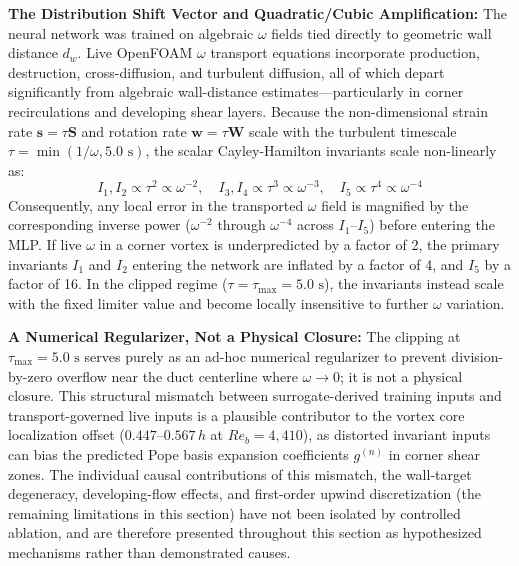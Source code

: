 \documentclass[11pt,a4paper]{article}
\begin{document}
\textbf{The Distribution Shift Vector and Quadratic/Cubic Amplification:} The neural network was trained on algebraic $\omega$ fields tied directly to geometric wall distance $d_w$. Live OpenFOAM $\omega$ transport equations incorporate production, destruction, cross-diffusion, and turbulent diffusion, all of which depart significantly from algebraic wall-distance estimates---particularly in corner recirculations and developing shear layers. Because the non-dimensional strain rate $\mathbf{s} = \tau \mathbf{S}$ and rotation rate $\mathbf{w} = \tau \mathbf{W}$ scale with the turbulent timescale $\tau = \min(1/\omega, 5.0\text{ s})$, the scalar Cayley-Hamilton invariants scale non-linearly as:
\begin{equation}
I_1, I_2 \propto \tau^2 \propto \omega^{-2}, \quad I_3, I_4 \propto \tau^3 \propto \omega^{-3}, \quad I_5 \propto \tau^4 \propto \omega^{-4}
\end{equation}
Consequently, any local error in the transported $\omega$ field is magnified by the corresponding inverse power ($\omega^{-2}$ through $\omega^{-4}$ across $I_1$--$I_5$) before entering the MLP. If live $\omega$ in a corner vortex is underpredicted by a factor of 2, the primary invariants $I_1$ and $I_2$ entering the network are inflated by a factor of 4, and $I_5$ by a factor of 16. In the clipped regime ($\tau = \tau_{\max} = 5.0\text{ s}$), the invariants instead scale with the fixed limiter value and become locally insensitive to further $\omega$ variation.

\textbf{A Numerical Regularizer, Not a Physical Closure:} The clipping at $\tau_{\max} = 5.0\text{ s}$ serves purely as an ad-hoc numerical regularizer to prevent division-by-zero overflow near the duct centerline where $\omega \to 0$; it is not a physical closure. This structural mismatch between surrogate-derived training inputs and transport-governed live inputs is a plausible contributor to the vortex core localization offset ($0.447\text{--}0.567\,h$ at $Re_b = 4,410$), as distorted invariant inputs can bias the predicted Pope basis expansion coefficients $g^{(n)}$ in corner shear zones. The individual causal contributions of this mismatch, the wall-target degeneracy, developing-flow effects, and first-order upwind discretization (the remaining limitations in this section) have not been isolated by controlled ablation, and are therefore presented throughout this section as hypothesized mechanisms rather than demonstrated causes.
\end{document}

